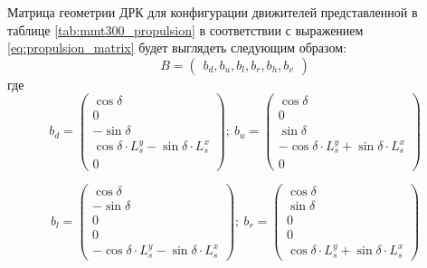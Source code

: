 Матрица геометрии ДРК для конфигурации движителей представленной в таблице \ref{tab:mmt300_propulsion} в соответствии с выражением \ref{eq:propulsion_matrix} будет выглядеть следующим образом:
\begin{equation}
    \label{eq:mmt300_propulsion_matrix}
    B = 
    \begin{pmatrix}
        b_d, b_u, b_l, b_r, b_h, b_v
    \end{pmatrix}
\end{equation}
\noindent где
\begin{equation*}
    b_d = 
    \begin{pmatrix}
        \cos{\delta} \\
        0 \\
        -\sin{\delta} \\
        \cos{\delta} \cdot L_s^y - \sin{\delta} \cdot L_s^x \\
        0
    \end{pmatrix}
    ;\:
    b_u = 
    \begin{pmatrix}
        \cos{\delta} \\
        0 \\
        \sin{\delta} \\
        -\cos{\delta} \cdot L_s^y + \sin{\delta} \cdot L_s^x \\
        0
    \end{pmatrix}
\end{equation*}

\begin{equation*}
    b_l = 
    \begin{pmatrix}
        \cos{\delta} \\
        -\sin{\delta} \\
        0 \\
        0 \\
        -\cos{\delta} \cdot L_s^y - \sin{\delta} \cdot L_s^x
    \end{pmatrix}
    ;\:
    b_r = 
    \begin{pmatrix}
        \cos{\delta} \\
        \sin{\delta} \\
        0 \\
        0 \\
        \cos{\delta} \cdot L_s^y +  \sin{\delta} \cdot L_s^x
    \end{pmatrix}
\end{equation*}

